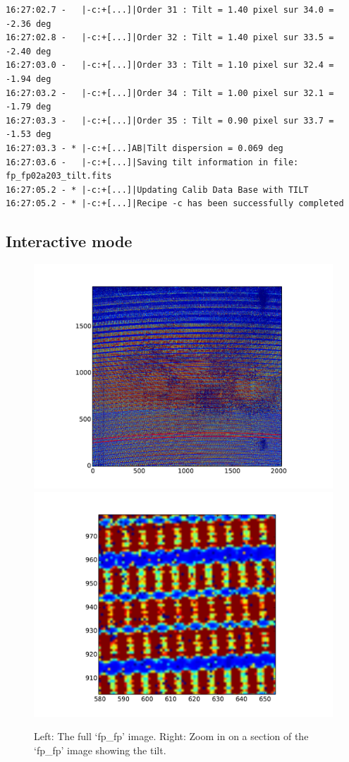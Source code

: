 \begin{lstlisting}[style=text]
16:27:02.7 -   |-c:+[...]|Order 31 : Tilt = 1.40 pixel sur 34.0 = -2.36 deg
16:27:02.8 -   |-c:+[...]|Order 32 : Tilt = 1.40 pixel sur 33.5 = -2.40 deg
16:27:03.0 -   |-c:+[...]|Order 33 : Tilt = 1.10 pixel sur 32.4 = -1.94 deg
16:27:03.2 -   |-c:+[...]|Order 34 : Tilt = 1.00 pixel sur 32.1 = -1.79 deg
16:27:03.3 -   |-c:+[...]|Order 35 : Tilt = 0.90 pixel sur 33.7 = -1.53 deg
16:27:03.3 - * |-c:+[...]AB|Tilt dispersion = 0.069 deg
16:27:03.6 -   |-c:+[...]|Saving tilt information in file: fp_fp02a203_tilt.fits
16:27:05.2 - * |-c:+[...]|Updating Calib Data Base with TILT
16:27:05.2 - * |-c:+[...]|Recipe -c has been successfully completed
\end{lstlisting}

\subsection{Interactive mode}

\begin{figure}
\begin{center}
\includegraphics[width=.59\textwidth]{figures/cal_SLIT_spirou_1.pdf}
\includegraphics[width=.29\textwidth]{figures/cal_SLIT_spirou_1a.pdf}
\caption{Left: The full `fp\_fp' image. Right: Zoom in on a section of the `fp\_fp' image showing the tilt.\label{figure:cal_slit_spirou_1}}
\end{center}
\end{figure}

